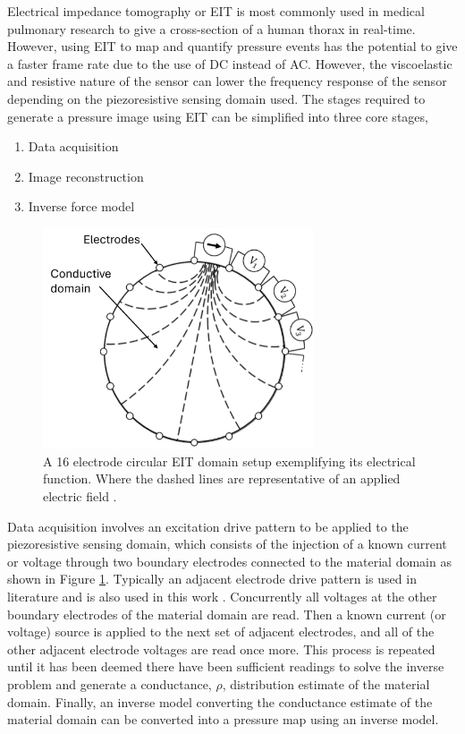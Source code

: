 Electrical impedance tomography or EIT is most commonly used in medical pulmonary research to give a cross-section of a human thorax in real-time. However, using EIT to map and quantify pressure events has the potential to give a faster frame rate due to the use of DC instead of AC. However, the viscoelastic and resistive nature of the sensor can lower the frequency response of the sensor depending on the piezoresistive sensing domain used. The stages required to generate a pressure image using EIT can be simplified into three core stages,
\begin{enumerate}
	\item Data acquisition
	\item Image reconstruction
	\item Inverse force model
\end{enumerate} 
\begin{figure}[H]
	\centering
	\includegraphics[width=8cm]{Figures/EIT_diagram_labelled.jpg}
	\vspace{0.3cm}
	\caption{A 16 electrode circular EIT domain setup exemplifying its electrical function. Where the dashed lines are representative of an applied electric field \cite{Ellingham2022} .}
	\label{fig:EIT_diagram}
\end{figure}
Data acquisition involves an excitation drive pattern to be applied to the piezoresistive sensing domain, which consists of the injection of a known current or voltage through two boundary electrodes connected to the material domain as shown in Figure \ref{fig:EIT_diagram}. Typically an adjacent electrode drive pattern is used in literature and is also used in this work \cite{Russo2017} . Concurrently all voltages at the other boundary electrodes of the material domain are read. Then a known current (or voltage) source is applied to the next set of adjacent electrodes, and all of the other adjacent electrode voltages are read once more. This process is repeated until it has been deemed there have been sufficient readings to solve the inverse problem and generate a conductance, $\rho$, distribution estimate of the material domain. Finally, an inverse model converting the conductance estimate of the material domain can be converted into a pressure map using an inverse model.


